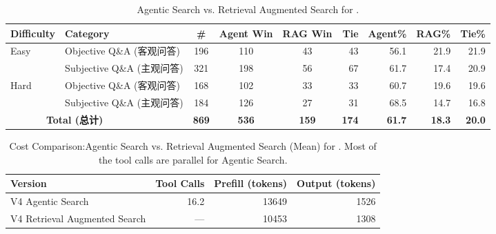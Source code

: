 \begin{table}[htbp]
\centering
\caption{Agentic Search vs. Retrieval Augmented Search for \dsvivp{}.}
\label{tab:agentic_search}
\small
\setlength{\tabcolsep}{4pt}
\begin{tabular}{l l c | c c r rrr}
\toprule
 \textbf{Difficulty} & \textbf{Category} & \textbf{\#}
  & \textbf{Agent Win} & \textbf{RAG Win} & \textbf{Tie}
  & \textbf{Agent\%} & \textbf{RAG\%} & \textbf{Tie\%} \\
\midrule


   \multirow{2}{*}{Easy} & Objective Q\&A (客观问答)  & 196 & 110 &  43 &  43 & 56.1 & 21.9 & 21.9 \\
                          & Subjective Q\&A (主观问答) & 321 & 198 &  56 &  67 & 61.7 & 17.4 & 20.9 \\
\cmidrule(lr){1-9}
   \multirow{2}{*}{Hard} & Objective Q\&A (客观问答)  & 168 & 102 &  33 &  33 & 60.7 & 19.6 & 19.6 \\
                          & Subjective Q\&A (主观问答) & 184 & 126 &  27 &  31 & 68.5 & 14.7 & 16.8 \\
\cmidrule(lr){1-9}
   \multicolumn{2}{c}{\textbf{Total (总计)~~~~~~~~}} & \textbf{869} & \textbf{536} & \textbf{159} & \textbf{174} & \textbf{61.7} & \textbf{18.3} & \textbf{20.0} \\
\bottomrule
\end{tabular}
\end{table}

\begin{table}[htbp]
\centering
\caption{Cost Comparison:Agentic Search vs. Retrieval Augmented Search (Mean) for \dsvivp{}. Most of the tool calls are parallel for Agentic Search.}
\label{tab:cost_comparison}
\small
\begin{tabular}{l rrr}
\toprule
\textbf{Version} & \textbf{Tool Calls} & \textbf{Prefill (tokens)} & \textbf{Output (tokens)} \\
\midrule
V4 Agentic Search & 16.2 & 13649 & 1526 \\
V4 Retrieval Augmented Search   &  --- & 10453 & 1308 \\
\bottomrule
\end{tabular}
\end{table}